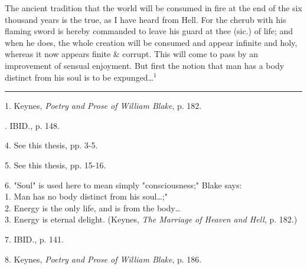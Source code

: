\begin{center}
	\parbox{0.8\textwidth}{
		\hspace*{5mm}The ancient tradition that the world will be consumed in fire at the end of the six thousand years is the true,
		as I have heard from Hell. For the cherub with his flaming sword is hereby commanded to leave his guard at thee (sic.) of life;
		and when he does, the whole creation will be consumed and appear infinite and holy, whereas it now appears 
		finite \& corrupt. This will come to pass by an improvement of sensual enjoyment.
		But first the notion that man has a body distinct from his soul is to be expunged\dots$^{1}$
	}%
\end{center}
\vspace*{\fill}
\noindent\rule{0.25\textwidth}{0.4pt}\par
1. Keynes, \textit{Poetry and Prose of William Blake}, p. 182.\par
[2, 3]. IBID., p. 148.\par
4. See this thesis, pp. 3-5.\par
5. See this thesis, pp. 15-16.\par
6. "Soul" is used here to mean simply "consciousness;" Blake says:\\1. Man has no body distinct from his soul\dots;"
\\2. Energy is the only life, and is from the body\dots\\3. Energy is eternal delight. (Keynes, \textit{The Marriage of Heaven and Hell}, p. 182.)\par
7. IBID., p. 141.\par
8. Keynes, \textit{Poetry and Prose of William Blake}, p. 186.\par

\newpage

{}

